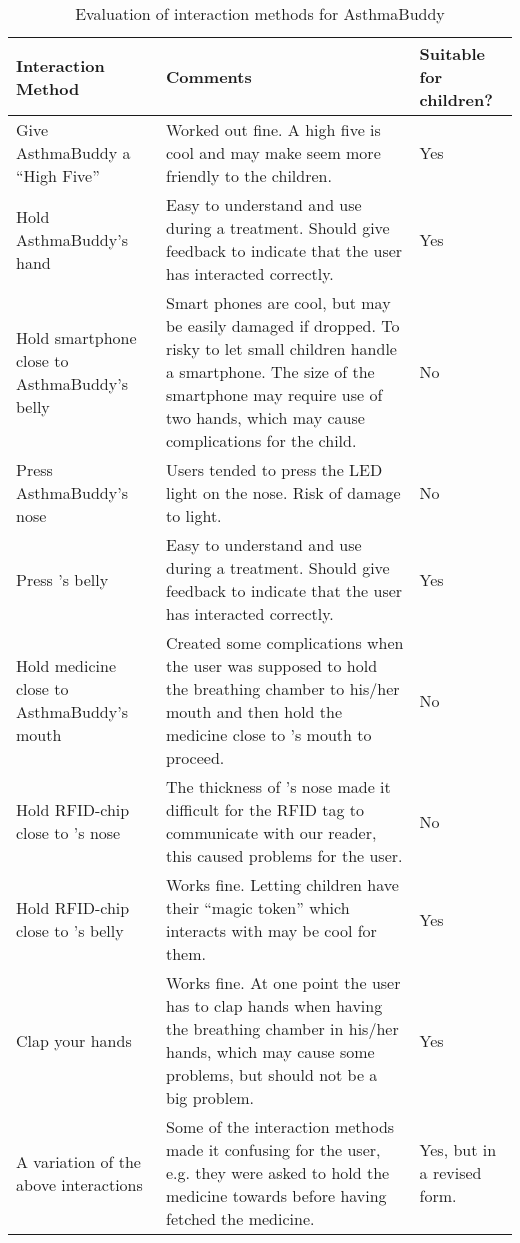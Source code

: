 \begin{table}[H]
\begin{tabular}{|p{4.0cm} | p{7.5cm} | p{2.5cm} |}
\hline 
\textbf{Interaction Method} & \textbf{Comments} & \textbf{Suitable for children?}\\
\hline
	Give AsthmaBuddy a ``High Five'' & Worked out fine. A high five is cool and may make \ab{} seem more friendly to the children. & Yes \\
\hline
	Hold AsthmaBuddy's hand & Easy to understand and use during a treatment. Should give feedback to indicate that the user has interacted correctly. & Yes\\
\hline
	Hold smartphone close to AsthmaBuddy's belly & Smart phones are cool, but may be easily damaged if dropped. To risky to let small children handle a smartphone. The size of the smartphone may require use of two hands, which may cause complications for the child. & No \\
\hline
	Press AsthmaBuddy's nose & Users tended to press the LED light on the nose. Risk of damage to light. & No\\
\hline
	Press \buddy{}'s belly & Easy to understand and use during a treatment. Should give feedback to indicate that the user has interacted correctly. & Yes\\
\hline
	Hold medicine close to AsthmaBuddy's mouth & Created some complications when the user was supposed to hold the breathing chamber to his/her mouth and then hold the medicine close to \ab{}'s mouth to proceed. & No \\
\hline
	Hold RFID-chip close to \buddy{}'s nose & The thickness of \buddy{}'s nose made it difficult for the RFID tag to communicate with our reader, this caused problems for the user. & No \\
\hline
	Hold RFID-chip close to \buddy{}'s belly & Works fine. Letting children have their ``magic token'' which interacts with \ab{} may be cool for them. & Yes\\
\hline
	Clap your hands & Works fine. At one point the user has to clap hands when having the breathing chamber in his/her hands, which may cause some problems, but should not be a big problem. & Yes\\
\hline
	A variation of the above interactions & Some of the interaction methods made it confusing for the user, e.g. they were asked to hold the medicine towards \ab{} before having fetched the medicine. & Yes, but in a revised form.\\
\hline
\end{tabular}
\caption{Evaluation of interaction methods for AsthmaBuddy}
\label{tab:interactioneval}
\end{table}

